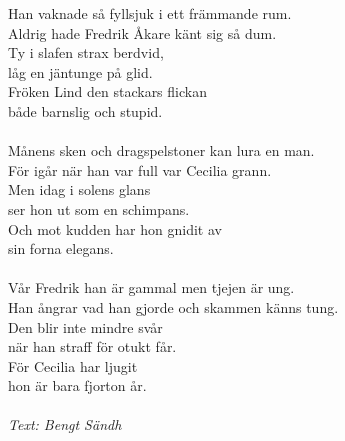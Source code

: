 \vspace{10pt}
Han vaknade så fyllsjuk i ett främmande rum.\\
Aldrig hade Fredrik Åkare känt sig så dum.\\
Ty i slafen strax berdvid,\\
låg en jäntunge på glid.\\
Fröken Lind den stackars flickan\\
både barnslig och stupid.\\
\\
Månens sken och dragspelstoner kan lura en man.\\
För igår när han var full var Cecilia grann.\\
Men idag i solens glans\\
ser hon ut som en schimpans.\\
Och mot kudden har hon gnidit av\\
sin forna elegans.\\
\\
Vår Fredrik han är gammal men tjejen är ung.\\
Han ångrar vad han gjorde och skammen känns tung.\\
Den blir inte mindre svår\\
när han straff för otukt får.\\
För Cecilia har ljugit\\
hon är bara fjorton år.\\
\\
{\footnotesize\textit{Text: Bengt Sändh}}
